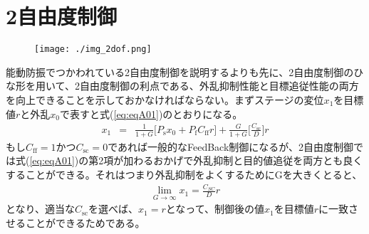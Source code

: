 \documentclass[a4paper,12pt]{jsarticle}
\begin{document}






\appendix
\section{2自由度制御}

\begin{figure}[H]
  \begin{center}
    \texttt{[image: ./img\_2dof.png]}
  \end{center}
  \caption{}\label{img:img_2dof}
\end{figure}

能動防振でつかわれている2自由度制御を説明するよりも先に、2自由度制御のひな形を用いて、2自由度制御の利点である、外乱抑制性能と目標追従性能の両方を向上できることを示しておかなければならない。まずステージの変位$x_1$を目標値$r$と外乱$x_0$で表すと式(\ref{eq:eqA01})のとおりになる。
\begin{eqnarray} \label{eq:eqA01}
  x_1 &=& \frac{1}{1+G}\Biggl[P_{\mathrm{s}}x_0 + P_{\mathrm{f}}C_{\mathrm{ff}}r\Biggl] + \frac{G}{1+G}\Biggl[\frac{C_{\mathrm{sc}}}{D}\Biggl]r
\end{eqnarray}
もし$C_{\mathrm{ff}}=1$かつ$C_{\mathrm{sc}}=0$であれば一般的なFeedBack制御になるが、2自由度制御では式(\ref{eq:eqA01})の第2項が加わるおかげで外乱抑制と目的値追従を両方とも良くすることができる。それはつまり外乱抑制をよくするためにGを大きくとると、
\begin{eqnarray} \label{eq:eqA02}
  \lim_{G \to \infty} x_1 = \frac{C_{SC}}{D}r
\end{eqnarray}
となり、適当な$C_{\mathrm{sc}}$を選べば、$x_{1}=r$となって、制御後の値$x_{1}$を目標値$r$に一致させることができるためである。
\end{document}
